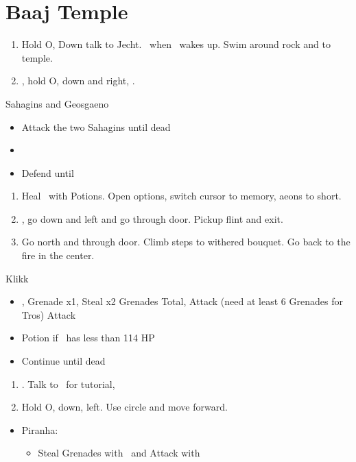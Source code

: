 \chapter{Baaj Temple}

\begin{enumerate}
	\item Hold O, Down talk to Jecht. \sd\ when \tidus\ wakes up. Swim around rock and to temple.
	\item \cs, hold O, down and right, \cs.
\end{enumerate}
\begin{battle}{Sahagins and Geosgaeno}
	\begin{itemize}
		\item Attack the two Sahagins until dead
		\item \cs[0:30]
		\item Defend until \cs
	\end{itemize}
\end{battle}
\begin{enumerate}[resume]
	\item Heal \tidus\ with Potions. Open options, switch cursor to memory, aeons to short.
	\item \cs, go down and left and go through door. Pickup flint and exit.
	\item Go north and through door. Climb steps to withered bouquet. Go back to the fire in the center. \cs[2:10]
\end{enumerate}
\begin{battle}[1500]{Klikk}
	\begin{itemize}
		\tidusf Attack x6, Potion once \tidus\ has less than 227 HP
		\item \cs, \sd
		\rikkuf Grenade x1, Steal x2 Grenades Total, Attack (need at least 6 Grenades for Tros)
		\tidusf Attack
		\item Potion if \tidus\ has less than 114 HP
		\item Continue until dead
	\end{itemize}
\end{battle}
\begin{enumerate}[resume]
	\item \cs[2:30]. Talk to \rikku\ for tutorial, \sd
	\item Hold O, down, left. Use circle and move forward.
\end{enumerate}
\begin{encounters}
	\begin{itemize}
		\item Piranha:
		\begin{itemize}
			\item Steal Grenades with \rikku\ and Attack with \tidus
		\end{itemize}
	\end{itemize}
\end{encounters}
